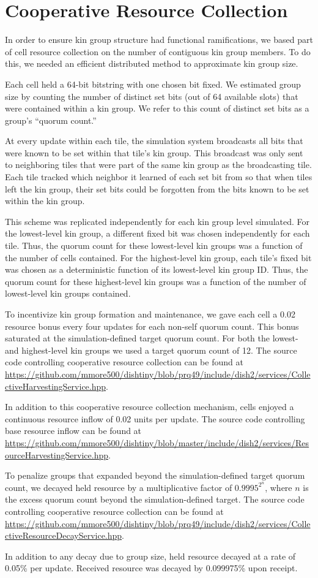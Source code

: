 \section{Cooperative Resource Collection}

In order to ensure kin group structure had functional ramifications, we based part of cell resource collection on the number of contiguous kin group members.
To do this, we needed an efficient distributed method to approximate kin group size.

Each cell held a 64-bit bitstring with one chosen bit fixed.
We estimated group size by counting the number of distinct set bits (out of 64 available slots) that were contained within a kin group.
We refer to this count of distinct set bits as a group's ``quorum count.''

At every update within each tile, the simulation system broadcasts all bits that were known to be set within that tile's kin group.
This broadcast was only sent to neighboring tiles that were part of the same kin group as the broadcasting tile.
Each tile tracked which neighbor it learned of each set bit from so that when tiles left the kin group, their set bits could be forgotten from the bits known to be set within the kin group.

This scheme was replicated independently for each kin group level simulated.
For the lowest-level kin group, a different fixed bit was chosen independently for each tile.
Thus, the quorum count for these lowest-level kin groups was a function of the number of cells contained.
For the highest-level kin group, each tile's fixed bit was chosen as a deterministic function of its lowest-level kin group ID.
Thus, the quorum count for these highest-level kin groups was a function of the number of lowest-level kin groups contained.

To incentivize kin group formation and maintenance, we gave each cell a 0.02 resource bonus every four updates for each non-self quorum count.
This bonus saturated at the simulation-defined target quorum count.
For both the lowest- and highest-level kin groups we used a target quorum count of 12.
The source code controlling cooperative resource collection can be found at \url{https://github.com/mmore500/dishtiny/blob/prq49/include/dish2/services/CollectiveHarvestingService.hpp}.

In addition to this cooperative resource collection mechanism, cells enjoyed a continuous resource inflow of 0.02 units per update.
The source code controlling base resource inflow can be found at \url{https://github.com/mmore500/dishtiny/blob/master/include/dish2/services/ResourceHarvestingService.hpp}.

To penalize groups that expanded beyond the simulation-defined target quorum count, we decayed held resource by a multiplicative factor of $0.9995^{2^n}$, where $n$ is the excess quorum count beyond the simulation-defined target.
The source code controlling cooperative resource collection can be found at \url{https://github.com/mmore500/dishtiny/blob/prq49/include/dish2/services/CollectiveResourceDecayService.hpp}.

In addition to any decay due to group size, held resource decayed at a rate of 0.05\% per update.
Received resource was decayed by 0.099975\% upon receipt.
